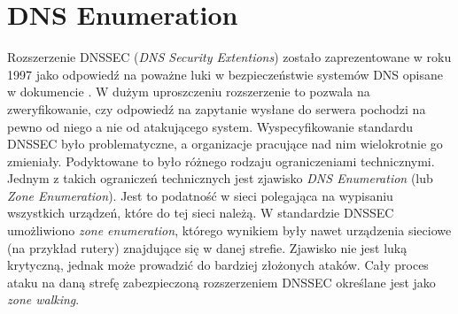 \section{DNS Enumeration}\label{zone_enumeration}
\noindent Rozszerzenie DNSSEC (\textit{DNS Security Extentions}) zostało zaprezentowane w roku 1997 \cite{RFC2065} jako odpowiedź na poważne
luki w bezpieczeństwie systemów DNS opisane w dokumencie \cite{DNSsecurityProblem}. W dużym uproszczeniu rozszerzenie to pozwala
na zweryfikowanie, czy odpowiedź na zapytanie wysłane do serwera pochodzi na pewno od niego a nie od atakującego system.
Wyspecyfikowanie standardu DNSSEC było problematyczne, a organizacje pracujące nad nim wielokrotnie go zmieniały. Podyktowane to
było różnego rodzaju ograniczeniami technicznymi. Jednym z takich ograniczeń technicznych jest zjawisko \textit{DNS Enumeration}
(lub \textit{Zone Enumeration}). Jest to podatność w sieci polegająca na wypisaniu wszystkich urządzeń, które do tej sieci należą.
W standardzie DNSSEC umożliwiono \textit{zone enumeration}, którego wynikiem były nawet urządzenia sieciowe (na przykład rutery)
znajdujące się w danej strefie. Zjawisko nie jest luką krytyczną, jednak może prowadzić do bardziej złożonych ataków. Cały
proces ataku na daną strefę zabezpieczoną rozszerzeniem DNSSEC określane jest jako \textit{zone walking}.

